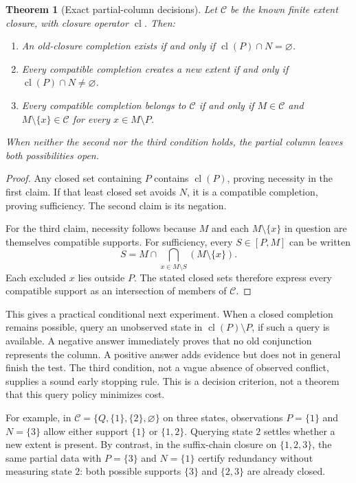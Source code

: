 \documentclass[11pt]{article}
\newtheorem{theorem}{Theorem}[section]
\theoremstyle{remark}
\newcommand{\cl}{\operatorname{cl}}
\newcommand{\C}{\mathcal C}
\begin{document}
\begin{theorem}[Exact partial-column decisions]
\label{thm:partial}
Let $\C$ be the known finite extent closure, with closure operator $\cl$. Then:
\begin{enumerate}
\item An old-closure completion exists if and only if $\cl(P)\cap N=\varnothing$.
\item Every compatible completion creates a new extent if and only if $\cl(P)\cap N\ne\varnothing$.
\item Every compatible completion belongs to $\C$ if and only if $M\in\C$ and $M\setminus\{x\}\in\C$ for every $x\in M\setminus P$.
\end{enumerate}
When neither the second nor the third condition holds, the partial column leaves both possibilities open.
\end{theorem}
\begin{proof}
Any closed set containing $P$ contains $\cl(P)$, proving necessity in the first claim. If that least closed set avoids $N$, it is a compatible completion, proving sufficiency. The second claim is its negation.

For the third claim, necessity follows because $M$ and each $M\setminus\{x\}$ in question are themselves compatible supports. For sufficiency, every $S\in[P,M]$ can be written
\[
 S=M\cap\bigcap_{x\in M\setminus S}(M\setminus\{x\}).
\]
Each excluded $x$ lies outside $P$. The stated closed sets therefore express every compatible support as an intersection of members of $\C$.
\end{proof}

This gives a practical conditional next experiment. When a closed completion remains possible, query an unobserved state in $\cl(P)\setminus P$, if such a query is available. A negative answer immediately proves that no old conjunction represents the column. A positive answer adds evidence but does not in general finish the test. The third condition, not a vague absence of observed conflict, supplies a sound early stopping rule. This is a decision criterion, not a theorem that this query policy minimizes cost.

For example, in $\C=\{Q,\{1\},\{2\},\varnothing\}$ on three states, observations $P=\{1\}$ and $N=\{3\}$ allow either support $\{1\}$ or $\{1,2\}$. Querying state $2$ settles whether a new extent is present. By contrast, in the suffix-chain closure on $\{1,2,3\}$, the same partial data with $P=\{3\}$ and $N=\{1\}$ certify redundancy without measuring state $2$: both possible supports $\{3\}$ and $\{2,3\}$ are already closed.
\end{document}
